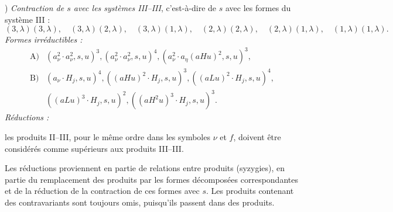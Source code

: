 \documentclass[11pt]{article}
\begin{document}
) \emph{Contraction de $s$ avec les systèmes III--III}, c'est-à-dire de $s$ avec les formes du système III :
\[
(3,\lambda)(3,\lambda),\quad (3,\lambda)(2,\lambda),\quad (3,\lambda)(1,\lambda),\quad
(2,\lambda)(2,\lambda),\quad (2,\lambda)(1,\lambda),\quad
(1,\lambda)(1,\lambda).
\]
\noindent\emph{Formes irréductibles :}
\[
\begin{array}{rl}
\text{A)}&(a_\nu^2\cdot a_\nu^2,s,u)^3,
(a_\nu^2\cdot a_\nu^2,s,u)^4,
(a_\nu^2\cdot a_\eta(aHu)^2,s,u)^3,\\[0.45em]
\text{B)}&(a_\nu\cdot H_j,s,u)^4,
((aHu)^2\cdot H_j,s,u)^3,
((aLu)^2\cdot H_j,s,u)^4,\\[0.25em]
&((aLu)^3\cdot H_j,s,u)^2,
((aH^2u)^3\cdot H_j,s,u)^3.
\end{array}
\]
\noindent\emph{Réductions :}

les produits II--III, pour le même ordre dans les symboles $\nu$ et $f$, doivent être considérés comme supérieurs aux produits III--III.

Les réductions proviennent en partie de relations entre produits (syzygies), en partie du remplacement des produits par les formes décomposées correspondantes et de la réduction de la contraction de ces formes avec $s$. Les produits contenant des contravariants sont toujours omis, puisqu'ils passent dans des produits.
\end{document}
